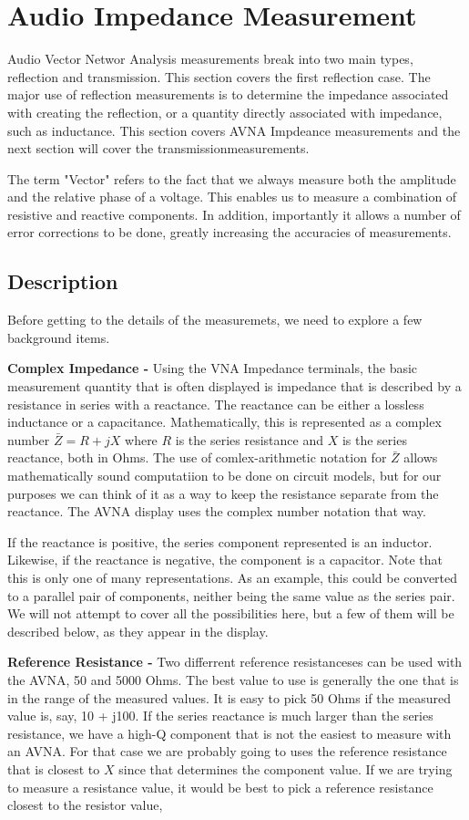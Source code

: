 \section{Audio Impedance Measurement}
%
Audio Vector Networ Analysis measurements break into two main types,  reflection and transmission.  This section covers the first reflection case.  The major use of reflection measurements is to determine the impedance
associated with creating the reflection, or a quantity directly associated with impedance, such as inductance. This section covers AVNA Impdeance measurements and the next section will cover the transmissionmeasurements.

The term "Vector" refers to the fact that we always measure both the amplitude and the relative phase of a 
voltage.  This enables us to measure a combination of resistive and reactive components.  In addition,
 importantly it allows a number of error corrections to be done, greatly increasing the accuracies of measurements.
%
\subsection{Description}
Before getting to the details of the measuremets, we need to explore a few background items.

\textbf{Complex Impedance - }Using the VNA Impedance terminals, the basic measurement quantity that is often displayed is impedance that is described by a resistance in series with a reactance.
The reactance can be either a lossless inductance or a capacitance. 
Mathematically, this is represented as a complex number \(\bar{Z}=R+jX\) where \(R\) is the series resistance and \(X\) is the series reactance, both in Ohms.
The use of comlex-arithmetic notation for  \(\bar{Z}\) allows mathematically sound computatiion to be done on circuit models, but for our purposes we can think of it as a way to keep the resistance separate from the reactance.
The AVNA display uses the complex number notation that way. 

If the reactance is positive, the series component represented is an inductor.
 Likewise, if the reactance is negative, the component is a capacitor.  Note that this is only one of many  representations.  As an example, this could be converted to a parallel pair of components, neither being the same value as the series pair.  We will not attempt to cover all the possibilities here, but a few of them will be described below, as they appear in the display.

\textbf{Reference Resistance - }Two differrent reference resistanceses can be used with the AVNA, 50 and 5000 Ohms.
The best value to use is generally the one that is in the range of the measured values. It is easy to pick 50 Ohms if the measured value is, say, 10 + j100.
If the series reactance is much larger than the series resistance, we have a high-Q component that is not the easiest to measure with an AVNA.
For that case we are probably going to uses the reference resistance that is closest to \(X\) since that determines the component value.
If we are trying to measure a resistance value, it would be best to pick a reference resistance closest to the 
resistor value,

